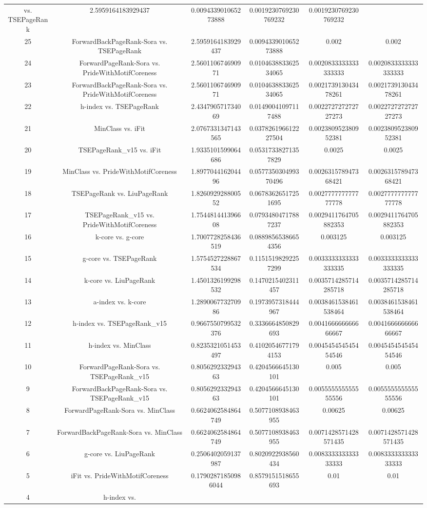 \documentclass[a4paper,10pt]{article}
\begin{document}
\begin{landscape}
\begin{table}[!htp]
\begin{tabular}{cccccc}
vs. TSEPageRank&2.5959164183929437&0.009433901065273888&0.0019230769230769232&0.0019230769230769232\\25&ForwardBackPageRank-Sora vs. TSEPageRank&2.5959164183929437&0.009433901065273888&0.002&0.002\\24&ForwardPageRank-Sora vs. PrideWithMotifCoreness&2.560110674690971&0.010463883362534065&0.0020833333333333333&0.0020833333333333333\\23&ForwardBackPageRank-Sora vs. PrideWithMotifCoreness&2.560110674690971&0.010463883362534065&0.002173913043478261&0.002173913043478261\\22&h-index vs. TSEPageRank&2.434790571734069&0.01490041097117488&0.002272727272727273&0.002272727272727273\\21&MinClass vs. iFit&2.0767331347143565&0.037826196612227504&0.002380952380952381&0.002380952380952381\\20&TSEPageRank_v15 vs. iFit&1.9335101599064686&0.05317338271357829&0.0025&0.0025\\19&MinClass vs. PrideWithMotifCoreness&1.897704416204496&0.057735030499370496&0.002631578947368421&0.002631578947368421\\18&TSEPageRank vs. LiuPageRank&1.826092928800552&0.06783626517251695&0.002777777777777778&0.002777777777777778\\17&TSEPageRank_v15 vs. PrideWithMotifCoreness&1.754481441396608&0.07934804717887237&0.0029411764705882353&0.0029411764705882353\\16&k-core vs. g-core&1.7007728258436519&0.08898565386654356&0.003125&0.003125\\15&g-core vs. TSEPageRank&1.5754527228867534&0.11515198292257299&0.0033333333333333335&0.0033333333333333335\\14&k-core vs. LiuPageRank&1.4501326199298532&0.1470215402311457&0.0035714285714285718&0.0035714285714285718\\13&a-index vs. k-core&1.289006773270986&0.1973957318444967&0.0038461538461538464&0.0038461538461538464\\12&h-index vs. TSEPageRank_v15&0.9667550799532376&0.3336664850829693&0.004166666666666667&0.004166666666666667\\11&h-index vs. MinClass&0.8235321051453497&0.41020546771794153&0.004545454545454546&0.004545454545454546\\10&ForwardPageRank-Sora vs. TSEPageRank_v15&0.805629233294363&0.4204566645130101&0.005&0.005\\9&ForwardBackPageRank-Sora vs. TSEPageRank_v15&0.805629233294363&0.4204566645130101&0.005555555555555556&0.005555555555555556\\8&ForwardPageRank-Sora vs. MinClass&0.6624062584864749&0.5077108938463955&0.00625&0.00625\\7&ForwardBackPageRank-Sora vs. MinClass&0.6624062584864749&0.5077108938463955&0.0071428571428571435&0.0071428571428571435\\6&g-core vs. LiuPageRank&0.2506402059137987&0.8020922938560434&0.008333333333333333&0.008333333333333333\\5&iFit vs. PrideWithMotifCoreness&0.17902871850986044&0.8579151518655693&0.01&0.01\\4&h-index vs. 
\end{tabular}
\end{table}
\end{landscape}
\end{document}
